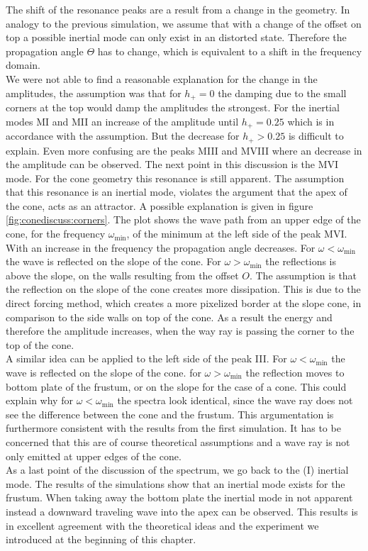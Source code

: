 The shift of the resonance peaks are a result from a change in the geometry.
In analogy to the previous simulation, we assume that with a change of the offset on top
a possible inertial mode can only exist in an distorted state.
Therefore the propagation angle $\Theta$ has to change,
which is equivalent to a shift in the frequency domain.\\
We were not able to find a reasonable explanation for the change in the amplitudes,
the assumption was that for $h_+=0$ the damping due to the small corners at the top
would damp the amplitudes the strongest.
For the inertial modes M\RN{1} and M\RN{2} an increase of the amplitude until $h_+=0.25$
which is in accordance with the assumption.
But the decrease for $h_+>0.25$ is difficult to explain.
Even more confusing are  the peaks M\RN{3} and M\RN{8} where an decrease in the amplitude
can be observed.
The next point in this discussion is the M\RN{6} mode.
For the cone geometry this resonance is still apparent.
The assumption that this resonance is an inertial mode,
violates the argument that the apex of the cone, acts as
an attractor.
A possible explanation is given in figure \ref{fig:conediscuss:corners}.
The plot shows the wave path from an upper edge of the cone, for the frequency $\omega_{\text{min}}$,
of the minimum at the left side of the peak M\RN{6}.
With an increase in the frequency the propagation angle decreases.
For $\omega<\omega_{\text{min}}$ the wave is reflected on the slope of the cone.
For $\omega>\omega_{\text{min}}$ the reflections is above the slope, on the walls resulting from the offset $O$.
The assumption is that the reflection on the slope of the cone creates more dissipation.
This is due to the direct forcing method, which creates a more pixelized border at the slope cone,
in comparison to the side walls on top of the cone.
As a result the energy and therefore the amplitude increases,
when the way ray is passing the corner to the top of the cone.\\
A similar idea can be applied to the left side of the peak \RN{3}.
For $\omega<\omega_{\text{min}}$ the wave is reflected on the slope of the cone.
for  $\omega>\omega_{\text{min}}$ the reflection moves to bottom plate of the frustum,
or on the slope for the case of a cone.
This could explain why for $\omega<\omega_{\text{min}}$  the spectra look identical,
since the wave ray does not see the difference between the cone and the frustum.
This argumentation is furthermore consistent with the results from the first simulation.
It has to be concerned that this are of course theoretical assumptions and a wave ray is not only emitted at
upper edges of the cone.\\
As a last point of the discussion of the spectrum, we go back to the (\RN{1}) inertial mode.
The results of the simulations show that an inertial mode exists for the frustum.
When taking away the bottom plate the inertial mode in not apparent instead
a downward traveling wave into the apex can be observed.
This results is in excellent agreement with the theoretical ideas and the experiment we introduced
at the beginning of this chapter.\\

